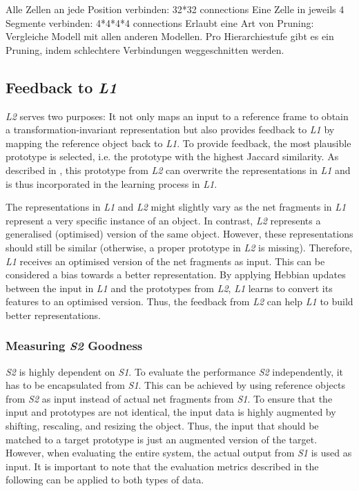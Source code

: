 Alle Zellen an jede Position verbinden: 32*32 connections
Eine Zelle in jeweils 4 Segmente verbinden: 4*4*4*4 connections
Erlaubt eine Art von Pruning: Vergleiche Modell mit allen anderen Modellen. Pro Hierarchiestufe gibt es ein Pruning, indem schlechtere Verbindungen weggeschnitten werden.




\subsection{Feedback to \emph{L1}}
\emph{L2} serves two purposes: It not only maps an input to a reference frame to obtain a transformation-invariant representation but also provides feedback to \emph{L1} by mapping the reference object back to \emph{L1}.
To provide feedback, the most plausible prototype is selected, i.e. the prototype with the highest Jaccard similarity.
As described in , this prototype from \emph{L2} can overwrite the representations in \emph{L1} and is thus incorporated in the learning process in \emph{L1}.

The representations in \emph{L1} and \emph{L2} might slightly vary as the net fragments in \emph{L1} represent a very specific instance of an object. In contrast, \emph{L2} represents a generalised (optimised) version of the same object.
However, these representations should still be similar (otherwise, a proper prototype in \emph{L2} is missing).
Therefore, \emph{L1} receives an optimised version of the net fragments as input. This can be considered a bias towards a better representation.
By applying Hebbian updates between the input in \emph{L1} and the prototypes from \emph{L2}, \emph{L1} learns to convert its features to an optimised version.
Thus, the feedback from \emph{L2} can help \emph{L1} to build better representations.






\subsubsection{Measuring \emph{S2} Goodness}
\emph{S2} is highly dependent on \emph{S1}. To evaluate the performance \emph{S2} independently, it has to be encapsulated from \emph{S1}.
This can be achieved by using reference objects from \emph{S2} as input instead of actual net fragments from \emph{S1}.
To ensure that the input and prototypes are not identical, the input data is highly augmented by shifting, rescaling, and resizing the object.
Thus, the input that should be matched to a target prototype is just an augmented version of the target.
However, when evaluating the entire system, the actual output from \emph{S1} is used as input.
It is important to note that the evaluation metrics described in the following can be applied to both types of data.

